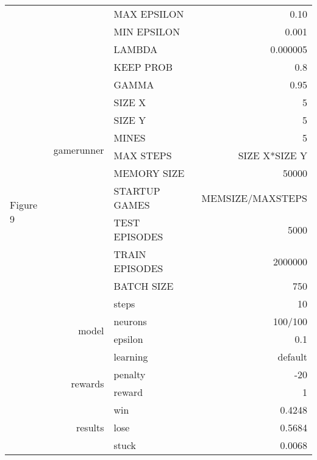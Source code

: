 \documentclass[9pt]{article}
\begin{document}
\begin{tabularx}{\textwidth}{l|r|X|r}
	\hline
	\hline
	\multirow{21}{*}{Figure 9} & \multirow{14}{*}{gamerunner} & MAX EPSILON	& 0.10\\
	& & MIN EPSILON	& 0.001 \\
	& & LAMBDA & 0.000005 \\
	& & KEEP PROB & 0.8 \\
	& & GAMMA	& 0.95 \\
	& & SIZE X & 5 \\
	& & SIZE Y & 5 \\
	& & MINES & 5 \\
	& & MAX STEPS & SIZE X*SIZE Y\\
	& & MEMORY SIZE & 50000 \\
	& & STARTUP GAMES & MEMSIZE/MAXSTEPS \\
	& & TEST EPISODES & 5000 \\
	& & TRAIN EPISODES & 2000000 \\
	& & BATCH SIZE & 750 \\
	& & steps & 10\\\cline{2-4}
	& \multirow{2}{*}{model} & neurons & 100/100 \\ 
	& & epsilon & 0.1\\
	& & learning & default \\\cline{2-4}
	& \multirow{2}{*}{rewards} & penalty & -20\\
	& & reward& 1\\\cline{2-4}
	& \multirow{3}{*}{results} & win & 0.4248 \\
	& & lose & 0.5684 \\
	& & stuck & 0.0068 \\
	\hline
\end{tabularx}
\end{document}
